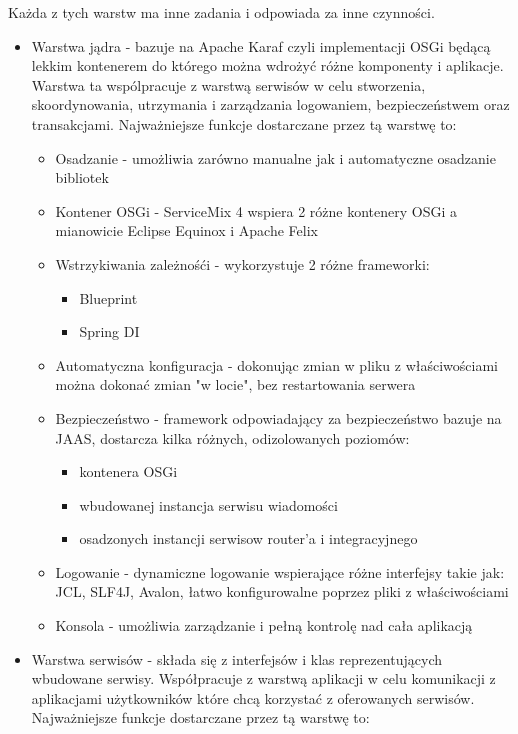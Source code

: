 Każda z tych warstw ma inne zadania i odpowiada za inne czynności.
\begin{itemize}
	\item Warstwa jądra - bazuje na Apache Karaf czyli implementacji OSGi będącą lekkim kontenerem do którego można wdrożyć różne komponenty i aplikacje. Warstwa ta wspólpracuje z warstwą serwisów w celu stworzenia, skoordynowania, utrzymania i zarządzania logowaniem, bezpieczeństwem oraz transakcjami. Najważniejsze funkcje dostarczane przez tą warstwę to:
	\begin{itemize}
		\item Osadzanie - umożliwia zarówno manualne jak i automatyczne osadzanie bibliotek
		\item Kontener OSGi - ServiceMix 4 wspiera 2 różne kontenery OSGi a mianowicie Eclipse Equinox i Apache Felix
		\item Wstrzykiwania zależnośći - wykorzystuje 2 różne frameworki:
			\begin{itemize}
				\item Blueprint
				\item Spring DI
			\end{itemize}   
		\item Automatyczna konfiguracja - dokonując zmian w pliku z właściwościami można dokonać zmian "w locie", bez restartowania serwera
		\item Bezpieczeństwo - framework odpowiadający za bezpieczeństwo bazuje na JAAS, dostarcza kilka różnych, odizolowanych poziomów:
			\begin{itemize}
				\item kontenera OSGi
				\item wbudowanej instancja serwisu wiadomości
				\item osadzonych instancji serwisow router'a i integracyjnego
			\end{itemize} 
		\item Logowanie - dynamiczne logowanie wspierające różne interfejsy takie jak: JCL, SLF4J, Avalon, łatwo konfigurowalne poprzez pliki z właściwościami
		\item Konsola - umożliwia zarządzanie i pełną kontrolę nad cała aplikacją
	\end{itemize}  
	\item Warstwa serwisów - 	składa się z interfejsów i klas reprezentujących wbudowane serwisy. Współpracuje z warstwą aplikacji w celu komunikacji z aplikacjami użytkowników które chcą korzystać z oferowanych serwisów. Najważniejsze funkcje dostarczane przez tą warstwę to:

\end{itemize}
